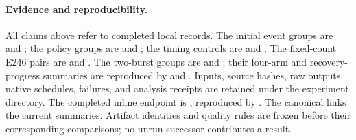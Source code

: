 \documentclass[10pt,a4paper]{article}
\begin{document}
\paragraph{Evidence and reproducibility.}
All claims above refer to completed local records. The initial event groups are
 and ; the policy groups are
 and ; the timing controls are
 and . The fixed-count E246
pairs are  and
. The two-burst groups are
 and
; their four-arm and
recovery-progress summaries are reproduced by
 and
. Inputs, source hashes,
raw outputs, native schedules, failures, and analysis receipts are retained
under the experiment directory. The completed inline endpoint is , reproduced by . The canonical  links the
current summaries. Artifact identities and quality rules are frozen before
their corresponding comparisons; no unrun successor contributes a result.
\end{document}
